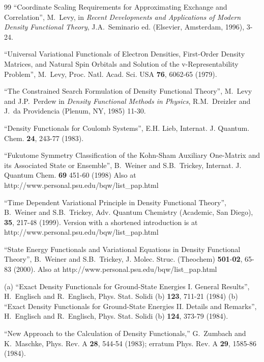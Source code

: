 \documentclass[nofootinbib,floatfix,aps,pra,preprint]{revtex4}
\begin{document}
\begin{thebibliography}{99}
 \textrm{{\small ``Coordinate Scaling Requirements for
Approximating Exchange and Correlation'', M.~Levy, in \emph{Recent
Developments and Applications of Modern Density Functional Theory},
J.A.~Seminario ed. (Elsevier, Amsterdam, 1996), 3-24. }}

 \textrm{{\small ``Universal Variational Functionals of
Electron Densities, First-Order Density Matrices, and Natural Spin Orbitals
and Solution of the v-Representability Problem'', M.~Levy, Proc. Natl. Acad.
Sci. USA \textbf{76}, 6062-65 (1979). }}

 \textrm{{\small ``The Constrained Search Formulation
of Density Functional Theory'', M.~Levy and J.P.~Perdew in \emph{Density
Functional Methods in Physics}, R.M.~Dreizler and J.~da Providencia (Plenum,
NY, 1985) 11-30. }}

 \textrm{{\small ``Density Functionals for Coulomb Systems'',
E.H. Lieb, Internat. J. Quantum. Chem. \textbf{24}, 243-77 (1983). }}

 \textrm{{\small ``Fukutome Symmetry Classification of the
Kohn-Sham Auxiliary One-Matrix and its Associated State or Ensemble'',
B.~Weiner and S.B.~Trickey, Internat. J. Quantum Chem. \textbf{69} 451-60
(1998) Also at http://www.personal.psu.edu/bqw/list\_pap.html }}

 \textrm{{\small ``Time Dependent Variational Principle in
Density Functional Theory'', B.~Weiner and S.B.~Trickey, Adv. Quantum
Chemistry (Academic, San Diego), \textbf{35}, 217-48 (1999). Version with a
shortened introduction is at http://www.personal.psu.edu/bqw/list\_pap.html }%
}

 \textrm{{\small ``State Energy Functionals and
Variational Equations in Density Functional Theory'', B.~Weiner and
S.B.~Trickey, J. Molec. Struc. (Theochem) \textbf{501}-\textbf{02}, 65-83
(2000). Also at http://www.personal.psu.edu/bqw/list\_pap.html }}

 \textrm{{\small (a) ``Exact Density Functionals for
Ground-State Energies I. General Results'', H.~Englisch and R.~Englisch,
Phys. Stat. Solidi (b) \textbf{123}, 711-21 (1984) (b) ``Exact Density
Functionals for Ground-State Energies II. Details and Remarks'', H.~Englisch
and R.~Englisch, Phys. Stat. Solidi (b) \textbf{124}, 373-79 (1984). }}

 \textrm{{\small ``New Approach to the Calculation of
Density Functionals,'' G.~Zumbach and K.~Maschke, Phys. Rev. A \textbf{28},
544-54 (1983); erratum Phys. Rev. A \textbf{29}, 1585-86 (1984). }}


\end{thebibliography}
\end{document}
